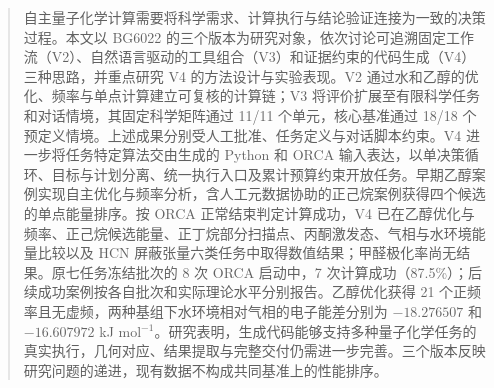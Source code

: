 \begin{abstract}
自主量子化学计算需要将科学需求、计算执行与结论验证连接为一致的决策过程。本文以 BG6022 的三个版本为研究对象，依次讨论可追溯固定工作流（V2）、自然语言驱动的工具组合（V3）和证据约束的代码生成（V4）三种思路，并重点研究 V4 的方法设计与实验表现。V2 通过水和乙醇的优化、频率与单点计算建立可复核的计算链；V3 将评价扩展至有限科学任务和对话情境，其固定科学矩阵通过 11/11 个单元，核心基准通过 18/18 个预定义情境。上述成果分别受人工批准、任务定义与对话脚本约束。V4 进一步将任务特定算法交由生成的 Python 和 ORCA 输入表达，以单决策循环、目标与计划分离、统一执行入口及累计预算约束开放任务。早期乙醇案例实现自主优化与频率分析，含人工元数据协助的正己烷案例获得四个候选的单点能量排序。按 ORCA 正常结束判定计算成功，V4 已在乙醇优化与频率、正己烷候选能量、正丁烷部分扫描点、丙酮激发态、气相与水环境能量比较以及 HCN 屏蔽张量六类任务中取得数值结果；甲醛极化率尚无结果。原七任务冻结批次的 8 次 ORCA 启动中，7 次计算成功（87.5\%）；后续成功案例按各自批次和实际理论水平分别报告。乙醇优化获得 21 个正频率且无虚频，两种基组下水环境相对气相的电子能差分别为 $-18.276507$ 和 $-16.607972$ kJ mol$^{-1}$。研究表明，生成代码能够支持多种量子化学任务的真实执行，几何对应、结果提取与完整交付仍需进一步完善。三个版本反映研究问题的递进，现有数据不构成共同基准上的性能排序。
\end{abstract}
